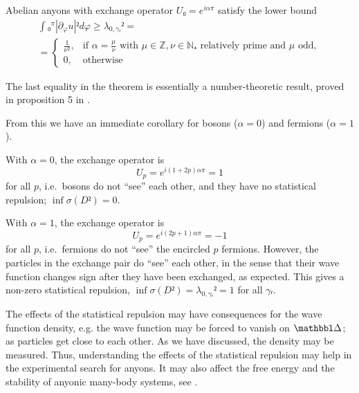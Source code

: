\begin{theorem}
  Abelian anyons with exchange operator $U₀ = e^{iαπ}$ satisfy the lower bound
  \begin{equation}
    \begin{gathered}
      ∫₀^π |∂_φu|² dφ ≥ λ_{0,γᵣ}² = \\
      = \begin{cases}
        \frac{1}{ν^2}, & \text{if $α = \frac{μ}{ν}$ with $μ ∈ ℤ, ν ∈ ℕ₊$ relatively prime and $μ$ odd}, \\
        0, & \text{otherwise}
      \end{cases}
    \end{gathered}
  \end{equation}
\end{theorem}

The last equality in the theorem is essentially a number-theoretic result, proved in proposition 5 in \cite{lundholm-solovej}.

From this we have an immediate corollary for bosons ($α = 0$) and fermions ($α = 1$).

\begin{corollary}
  With $α = 0$, the exchange operator is
  \begin{equation}
    U_p = e^{i(1+2p)απ} = 1
  \end{equation}
  for all $p$, i.e.\ bosons do not ``see'' each other, and they have no statistical repulsion; $\inf σ(D²) = 0$.

  With $α = 1$, the exchange operator is
  \begin{equation}
    U_p = e^{i(2p+1)απ} = -1
  \end{equation}
  for all $p$, i.e.\ fermions do not ``see'' the encircled $p$ fermions. However, the particles in the exchange pair do ``see'' each other, in the sense that their wave function changes sign after they have been exchanged, as expected. This gives a non-zero statistical repulsion, $\inf σ(D²) = λ_{0,γᵣ}² = 1$ for all $γᵣ$.
\end{corollary}

The effects of the statistical repulsion may have consequences for the wave function density, e.g. the wave function may be forced to vanish on $\bbDelta$; as particles get close to each other. As we have discussed, the density may be measured. Thus, understanding the effects of the statistical repulsion may help in the experimental search for anyons. It may also affect the free energy and the stability of anyonic many-body systems, see \cite{lundholm-solovej,many-anyon trial states,lundholm-solovejAHP}.






